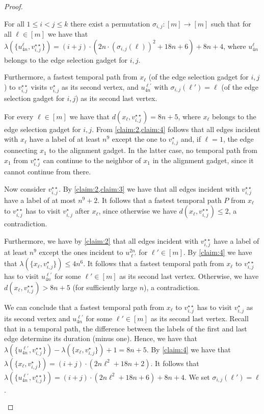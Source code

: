 \documentclass[a4paper,UKenglish,cleveref, autoref, thm-restate, anonymous]{lipics-v2021}
\begin{document}
\begin{proof}
\begin{claim}\label{claim:5}
    For all $1\le i<j\le k$ there exist a permutation $\sigma_{i,j}:[m]\rightarrow [m]$ such that for all $\ell\in[m]$ we have that $\lambda(\{u^\ell_{4n},v_{i,j}^{\star\star}\})=(i+j)\cdot (2n\cdot (\sigma_{i,j}(\ell))^2 +18n+6)+8n+4$, where $u^\ell_{4n}$ belongs to the edge selection gadget for $i,j$.

    Furthermore, a fastest temporal path from $x_\ell$ (of the edge selection gadget for $i,j$) to $v_{i,j}^{\star\star}$ visits $v_{i,j}^\star$ as its second vertex, and $u^{\ell'}_{4n}$ with $\sigma_{i,j}(\ell')=\ell$ (of the edge selection gadget for $i,j$) as its second last vertex.
\end{claim}
\begin{claimproof}
    For every $\ell\in[m]$ we have that $d(x_\ell,v_{i,j}^{\star\star})=8n+5$, where $x_\ell$ belongs to the edge selection gadget for $i,j$. From \cref{claim:2,claim:4} follows that all edges incident with $x_\ell$ have a label of at least $n^9$ except the one to $v_{i,j}^\star$ and, if $\ell=1$, the edge connecting $x_1$ to the alignment gadget. In the latter case, no temporal path from $x_1$ from $v_{i,j}^{\star\star}$ can continue to the neighbor of $x_1$ in the alignment gadget, since it cannot continue from there.

    Now consider $v_{i,j}^{\star\star}$. By \cref{claim:2,claim:3} we have that all edges incident with $v_{i,j}^{\star\star}$ have a label of at most $n^9+2$. It follows that a fastest temporal path $P$ from $x_\ell$ to $v_{i,j}^{\star\star}$ has to visit $v_{i,j}^\star$ after $x_\ell$, since otherwise we have $d(x_\ell,v_{i,j}^{\star\star})\le 2$, a contradiction.

    Furthermore, we have by \cref{claim:2} that all edges incident with $v_{i,j}^{\star\star}$ have a label of at least $n^9$ except the ones incident to $u_{\ell'}^{2n}$ for $\ell'\in[m]$. By \cref{claim:4} we have that $\lambda(\{x_\ell,v_{i,j}^{\star}\})\le 4n^6$.
    It follows that a fastest temporal path from $x_\ell$ to $v_{i,j}^{\star\star}$ has to visit $u^{\ell'}_{4n}$ for some $\ell'\in[m]$ as its second last vertex. Otherwise, we have $d(x_\ell,v_{i,j}^{\star\star})> 8n+5$ (for sufficiently large $n$), a contradiction.

    We can conclude that a fastest temporal path from $x_\ell$ to $v_{i,j}^{\star\star}$ has to visit $v_{i,j}^\star$ as its second vertex and $u^{\ell'}_{4n}$ for some $\ell'\in[m]$ as its second last vertex. Recall that in a  temporal path, the difference between the labels of the first and last edge determine its duration (minus one). Hence, we have that $\lambda(\{u^{\ell'}_{4n},v_{i,j}^{\star\star}\})-\lambda(\{x_\ell,v_{i,j}^{\star}\})+1=8n+5$.
    By \cref{claim:4} we have that $\lambda(\{x_\ell,v_{i,j}^{\star}\})=(i+j)\cdot (2n\ell^2+18n +2)$. It follows that $\lambda(\{u^{\ell'}_{4n},v_{i,j}^{\star\star}\})=(i+j)\cdot (2n\ell^2 +18n+6)+8n+4$. We set $\sigma_{i,j}(\ell')=\ell$.


\end{claimproof}
\end{proof}
\end{document}
